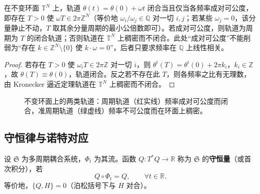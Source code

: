 \begin{corollary}[不变环面上的运动周期]\label{cor:ps_torus_rotation_period}
在不变环面 $\mathbb{T}^N$ 上，轨道 $\theta(t) = \theta(0) + \omega t$ 闭合当且仅当各频率成对可公度，即存在 $T>0$ 使 $\omega T\in 2\pi\mathbb{Z}^N$（等价地 $\omega_i/\omega_j\in\mathbb{Q}$ 对一切 $i,j$；若某些 $\omega_j=0$，该分量静止不动，$T$ 取其余分量周期的最小公倍数即可）。若成对可公度，则轨道为周期为 $T$ 的闭合轨道；否则轨道在 $\mathbb{T}^N$ 上稠密而不闭合。此处“成对可公度”不能削弱为“存在 $k\in\mathbb{Z}^N\setminus\{0\}$ 使 $k\cdot\omega=0$”，后者只要求频率在 $\mathbb{Q}$ 上线性相关。
\end{corollary}

\begin{proof}
若存在 $T>0$ 使 $\omega_i T\in 2\pi\mathbb{Z}$ 对一切 $i$，则 $\theta^i(T)=\theta^i(0)+2\pi k_i$，$k_i\in\mathbb{Z}$，故 $\theta(T)\equiv\theta(0)$，轨道闭合。反之若不存在此 $T$，则各频率之比有无理数，由 Kronecker 逼近定理轨道在 $\mathbb{T}^N$ 上稠密而不闭合。
\end{proof}

\begin{figure}[htbp]
\centering
{}
\caption{不变环面上的两类轨道：周期轨道（红实线）频率成对可公度而闭合，准周期轨道（绿虚线）频率不可公度而在环面上稠密。}
\label{fig:ps_invariant_torus}
\end{figure}

\subsection{守恒律与诺特对应}\label{subsec:ps_noether_correspondence}

\begin{definition}[周期系统的守恒量]\label{def:ps_conserved_quantity}
设 $\mathfrak{S}$ 为多周期耦合系统，$\Phi_t$ 为其流。函数 $Q:T^*Q\to\mathbb{R}$ 称为 $\mathfrak{S}$ 的\textbf{守恒量}（或首次积分），若
\[
Q\circ \Phi_t = Q, \qquad \forall t\in\mathbb{R}.
\]
等价地，$\{Q,H\} = 0$（泊松括号下与 $H$ 对合）。
\end{definition}

